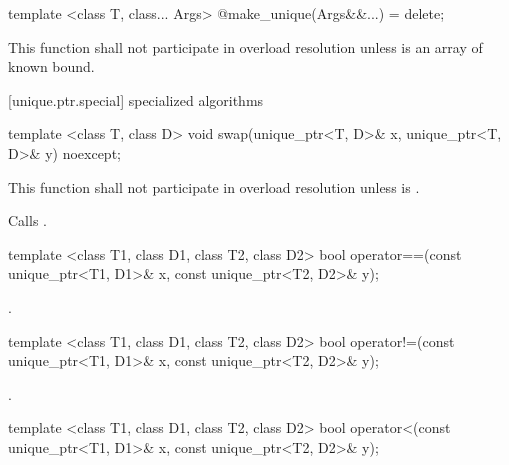 \begin{itemdecl}
template <class T, class... Args> @\unspec@ make_unique(Args&&...) = delete;
\end{itemdecl}

\begin{itemdescr}
\pnum
\remarks This function shall not participate in overload resolution unless  is an array of known bound.

\end{itemdescr}

[unique.ptr.special]{ specialized algorithms}

\begin{itemdecl}
template <class T, class D> void swap(unique_ptr<T, D>& x, unique_ptr<T, D>& y) noexcept;
\end{itemdecl}

\begin{itemdescr}
\pnum
\remarks This function shall not participate in overload resolution
unless  is .

\pnum
\effects Calls .
\end{itemdescr}

%
%
\begin{itemdecl}
template <class T1, class D1, class T2, class D2>
  bool operator==(const unique_ptr<T1, D1>& x, const unique_ptr<T2, D2>& y);
\end{itemdecl}

\begin{itemdescr}
\pnum
\returns {}.
\end{itemdescr}

%
%
\begin{itemdecl}
template <class T1, class D1, class T2, class D2>
  bool operator!=(const unique_ptr<T1, D1>& x, const unique_ptr<T2, D2>& y);
\end{itemdecl}

\begin{itemdescr}
\pnum
\returns {}.
\end{itemdescr}

%
%
\begin{itemdecl}
template <class T1, class D1, class T2, class D2>
  bool operator<(const unique_ptr<T1, D1>& x, const unique_ptr<T2, D2>& y);
\end{itemdecl}

